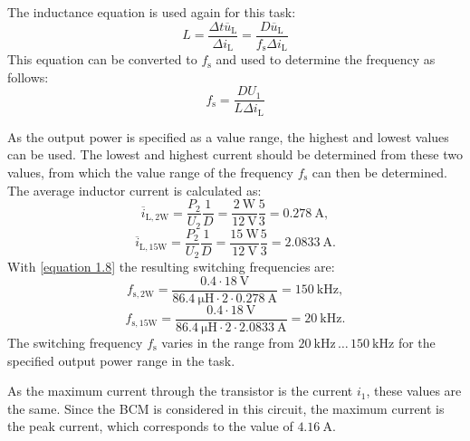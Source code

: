  \begin{solutionblock}
     The inductance equation is used again for this task:
     \begin{equation}
        L = \frac{\Delta t \overline u_{\mathrm{L}}}{\Delta i_{\mathrm{L}}}= \frac{D \overline u_{\mathrm{L}}}{f_\mathrm{s}\Delta i_{\mathrm{L}}}
     \end{equation}
     This equation can be converted to $f_\mathrm{s}$ and used to determine the frequency as follows:
     \begin{equation}
        f_\mathrm{s} = \frac{DU_{\mathrm{1}}}{L\Delta i_{\mathrm{L}}} \label{equation 1.8}
     \end{equation}
      
As the output power is specified as a value range, the highest and lowest values can be used. The lowest and highest current should be determined from these two values, from which the value range of the frequency $f_\mathrm{s}$ can then be determined.
The average inductor current is calculated as:
     \begin{equation}
        \overline{i}_\mathrm{L,2W}= \frac{P_\mathrm{2}}{U_\mathrm{2}}\frac{1}{D}=\frac{\SI{2}{\watt}}{\SI{12}{\volt}}\frac{5}{3}=\SI{0.278}{\ampere},
     \end{equation}
     \begin{equation}
        \overline{i}_\mathrm{L,15W}= \frac{P_\mathrm{2}}{U_\mathrm{2}}\frac{1}{D}=\frac{\SI{15}{\watt}}{\SI{12}{\volt}}\frac{5}{3}=\SI{2.0833}{\ampere}.
     \end{equation}
     With \ref{equation 1.8} the resulting switching frequencies are:
     \begin{equation}
        f_\mathrm{s,2W}=\frac{0.4\cdot\SI{18}{\volt}}{\SI{86.4}{\micro\henry}\cdot 2\cdot \SI{0.278}{\ampere}}=\SI{150}{\kilo \hertz},
     \end{equation}
     \begin{equation}
        f_\mathrm{s,15W}=\frac{0.4\cdot\SI{18}{\volt}}{\SI{86.4}{\micro\henry}\cdot 2\cdot \SI{2.0833}{\ampere}}=\SI{20}{\kilo \hertz}.
     \end{equation}
     The switching frequency $f_\mathrm{s}$ varies in the range from $\SI{20}{\kilo \hertz} \, \dots \, \SI{150}{\kilo \hertz}$ for the specified output power range in the task.
 \end{solutionblock}

 \begin{solutionblock}
    As the maximum current through the transistor is the current $i_1$, these values are the same. Since the BCM is considered in this circuit, the maximum current is the peak current, which corresponds to the value of $\SI{4.16}{\ampere}$.
 \end{solutionblock}


